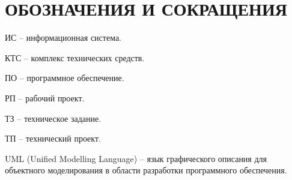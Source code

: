 \section*{ОБОЗНАЧЕНИЯ И СОКРАЩЕНИЯ}

ИС -- информационная система.

КТС -- комплекс технических средств.

ПО -- программное обеспечение.

РП -- рабочий проект.

ТЗ -- техническое задание.

ТП -- технический проект.

UML (Unified Modelling Language) -- язык графического описания для объектного моделирования в области разработки программного обеспечения.
